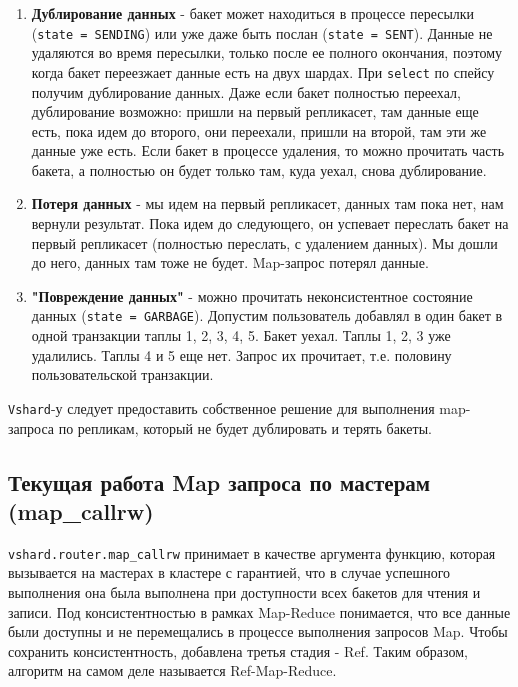 \begin{enumerate}
\item \textbf{Дублирование данных} - бакет может находиться в процессе
    пересылки (\texttt{state = SENDING}) или уже даже быть послан
        (\texttt{state = SENT}). Данные не удаляются во время пересылки, только
        после ее полного окончания, поэтому когда бакет переезжает данные есть
        на двух шардах. При \texttt{select} по спейсу получим дублирование
        данных. Даже если бакет полностью переехал, дублирование возможно:
        пришли на первый репликасет, там данные еще есть, пока идем до второго,
        они переехали, пришли на второй, там эти же данные уже есть. Если бакет
        в процессе удаления, то можно прочитать часть бакета, а полностью он
        будет только там, куда уехал, снова дублирование.

\item \textbf{Потеря данных} - мы идем на первый репликасет, данных там пока
    нет, нам вернули результат. Пока идем до следующего, он успевает переслать
        бакет на первый репликасет (полностью переслать, с удалением данных).
        Мы дошли до него, данных там тоже не будет. Map-запрос потерял данные.

\item \textbf{"Повреждение данных"} - можно прочитать неконсистентное состояние
    данных (\texttt{state = GARBAGE}). Допустим пользователь добавлял в один
        бакет в одной транзакции таплы 1, 2, 3, 4, 5. Бакет уехал. Таплы 1, 2,
        3 уже удалились. Таплы 4 и 5 еще нет. Запрос их прочитает, т.е.
        половину пользовательской транзакции.

\end{enumerate}

\texttt{Vshard}-у следует предоставить собственное решение для выполнения
map-запроса по репликам, который не будет дублировать и терять бакеты.

\subsection{Текущая работа Map запроса по мастерам (map\_callrw)}

\texttt{vshard.router.map\_callrw} принимает в качестве аргумента функцию,
которая вызывается на мастерах в кластере с гарантией, что в случае успешного
выполнения она была выполнена при доступности всех бакетов для чтения и записи.
Под консистентностью в рамках Map-Reduce понимается, что все данные были
доступны и не перемещались в процессе выполнения запросов Map. Чтобы сохранить
консистентность, добавлена третья стадия - Ref. Таким образом, алгоритм на
самом деле называется Ref-Map-Reduce.

